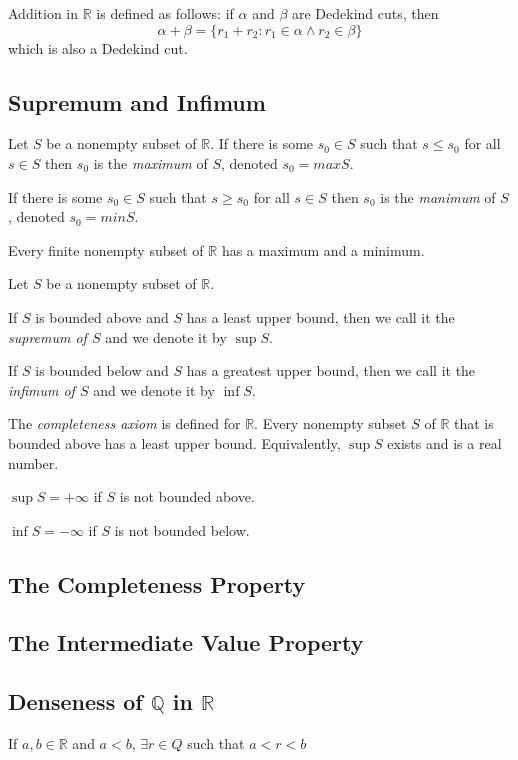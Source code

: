 \documentclass[12pt]{article}
\newcommand{\Q}{\mathbb{Q}}
\newcommand{\R}{\mathbb{R}}
\begin{document}
Addition in $\R$ is defined as follows: if $\alpha$ and $\beta$ are Dedekind cuts, then $$\alpha + \beta = \{r_{1} + r_{2} : r_{1} \in \alpha \land r_{2} \in \beta\}$$ which is also a Dedekind cut.

\subsection{Supremum and Infimum}

Let $S$ be a nonempty subset of $\R$.
If there is some $s_{0} \in S$ such that $s \leq s_{0}$ for all $s \in S$ then $s_{0}$ is the \textit{maximum} of $S$, denoted $s_{0} = max S$.

If there is some $s_{0} \in S$ such that $s \geq s_{0}$ for all $s \in S$ then $s_{0}$ is the \textit{manimum} of $S$, denoted $s_{0} = min S$.

Every finite nonempty subset of $\R$ has a maximum and a minimum.

Let $S$ be a nonempty subset of $\R$.

If $S$ is bounded above and $S$ has a least upper bound, then we call it the \textit{supremum of $S$} and we denote it by $\sup S$.

If $S$ is bounded below and $S$ has a greatest upper bound, then we call it the \textit{infimum of $S$} and we denote it by $\inf S$.

The \textit{completeness axiom} is defined for $\R$. Every nonempty subset $S$ of $\R$ that is bounded above has a least upper bound. Equivalently, $\sup S$ exists and is a real number.

$\sup S = +\infty$ if $S$ is not bounded above.

$\inf S = -\infty$ if $S$ is not bounded below.

\subsection{The Completeness Property}

\subsection{The Intermediate Value Property}

\subsection{Denseness of $\Q$ in $\R$}

If $a, b \in \R$ and $a < b$, $\exists r \in Q$ such that $a < r < b$
\end{document}
